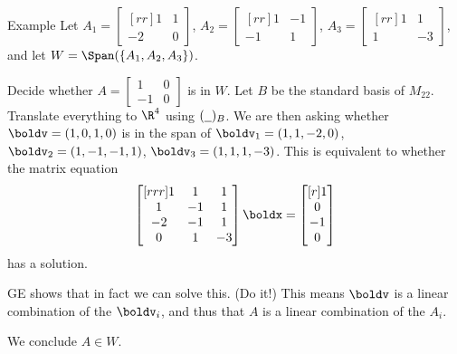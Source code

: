 \begin{frame}{Example}
Let $A_1=\begin{bmatrix}[rr]
1&1\\-2&0
\end{bmatrix}
$,
$A_2=\begin{bmatrix}[rr]
1&-1\\-1&1
\end{bmatrix}
$,
$A_3=\begin{bmatrix}[rr]
1&1\\1&-3
\end{bmatrix}
$, and let $W=\Span(\{A_1,A_2,A_3\})$. 

Decide whether $A=\begin{bmatrix}
1&0\\-1&0
\end{bmatrix}
$
is in $W$. 
\bpause
Let $B$ be the standard basis of $M_{22}$. Translate everything to $\R^4$ using $(\underline{\hspace{.2cm}})_B$. 
\bspace We are then asking whether $\boldv=(1,0,1,0)$ is in the span of $\boldv_1=(1,1,-2,0)$, $\boldv_2=(1,-1,-1,1)$, $\boldv_3=(1,1,1,-3)$. This is equivalent to whether the matrix equation 
\[
\begin{bmatrix}[rrr]
1&1&1\\
1&-1&1\\
-2&-1&1\\
0&1&-3
\end{bmatrix}
\boldx
=\begin{bmatrix}[r]
1\\ 0\\-1 \\0 
\end{bmatrix}
\] 
has a solution. 

GE shows that in fact we can solve this. (Do it!) This means $\boldv$ is a linear combination of the $\boldv_i$, and thus that $A$ is a linear combination of the $A_i$. 

We conclude $A\in W$. 
\end{frame}
